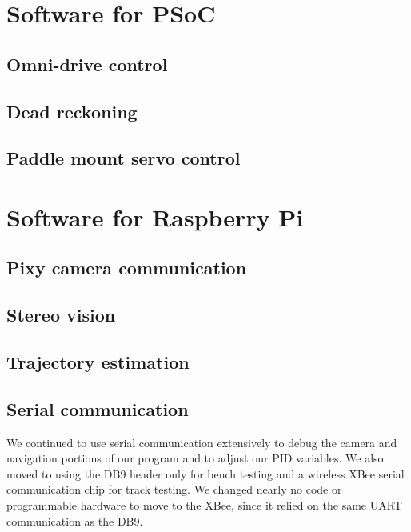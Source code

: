 \documentclass[letterpaper, 11pt]{article}
\begin{document}
\begin{enumerate}[label=\textbf{\arabic*.}]
\section{Software for PSoC}

\subsection{Omni-drive control}

\subsection{Dead reckoning}

\subsection{Paddle mount servo control}

\section{Software for Raspberry Pi}
\subsection{Pixy camera communication}

\subsection{Stereo vision}

\subsection{Trajectory estimation}

\subsection{Serial communication}
We continued to use serial communication extensively to debug the camera and navigation portions of our program and to adjust our PID variables. We also moved to using the DB9 header only for bench testing and a wireless XBee serial communication chip for track testing. We changed nearly no code or programmable hardware to move to the XBee, since it relied on the same UART communication as the DB9.


\end{enumerate}
\end{document}
